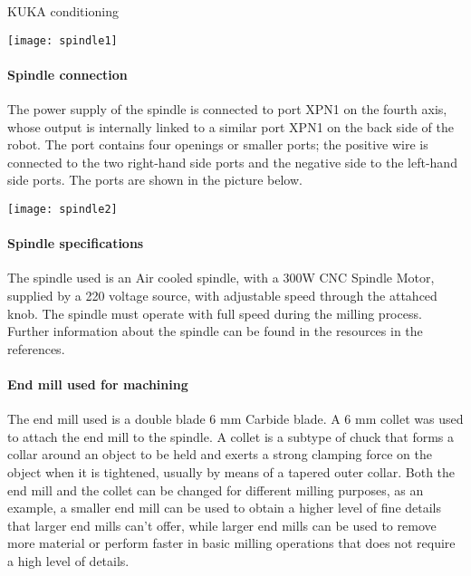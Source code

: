 \documentclass{book}
\begin{document}
\begin{chapter}{KUKA conditioning}
 \begin{center}
 	\texttt{[image: spindle1]}
 \end{center}

\paragraph{Spindle connection}
The power supply of the spindle is connected to port XPN1 on the fourth axis, whose output is internally linked to a similar port XPN1 on the back side of the robot. The port contains four openings or smaller ports; the positive wire is connected to the two right-hand side ports and the negative side to the left-hand side ports. The ports are shown in the picture below.

  \begin{center}
 	\texttt{[image: spindle2]}
 \end{center}

\paragraph{Spindle specifications }

The spindle used is an Air cooled spindle, with a 300W CNC Spindle Motor, supplied by a 220 voltage source, with adjustable speed through the attahced knob. The spindle must operate with full speed during the milling process. Further information about the spindle can be found in the resources in the references. 

\paragraph{End mill used for machining}

The end mill used is a double blade 6 mm Carbide blade. A 6 mm collet was used to attach the end mill to the spindle. A collet is a subtype of chuck that forms a collar around an object to be held and exerts a strong clamping force on the object when it is tightened, usually by means of a tapered outer collar. Both the end mill and the collet can be changed for different milling purposes, as an example, a smaller end mill can be used to obtain a higher level of fine details that larger end mills can’t offer, while larger end mills can be used to remove more material or perform faster in basic milling operations that does not require a high level of details. 

 
 
 
	\end{chapter}
\end{document}
